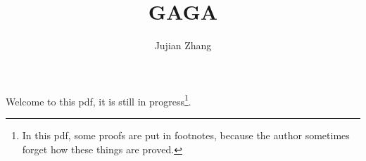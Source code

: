 \documentclass[a4paper]{report}
\title{GAGA}
\author{Jujian Zhang}
\begin{document}
\maketitle

Welcome to this pdf, it is still in progress\footnote{In this pdf, some proofs are put in footnotes, because the author sometimes forget how these things are proved.}.





\end{document}
